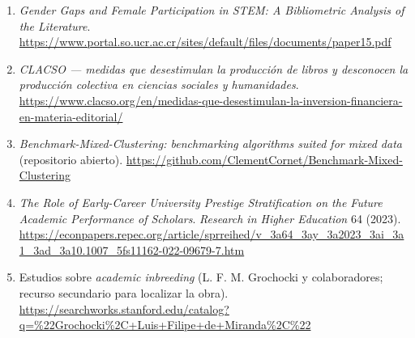 \begin{enumerate}
{        a comparative bibliometric analysis (2020--2024)}.
        \url{https://pure.ucacue.edu.ec/en/publications/disparidades-de-g%C3%A9nero-en-la-producci%C3%B3n-cient%C3%ADfica-de-la-comunida/}
  \item \emph{Gender Gaps and Female Participation in STEM: A Bibliometric
        Analysis of the Literature}.
        \url{https://www.portal.so.ucr.ac.cr/sites/default/files/documents/paper15.pdf}
  \item \emph{CLACSO — medidas que desestimulan la producción de libros y
        desconocen la producción colectiva en ciencias sociales y humanidades}.
        \url{https://www.clacso.org/en/medidas-que-desestimulan-la-inversion-financiera-en-materia-editorial/}
  \item \emph{Benchmark-Mixed-Clustering: benchmarking algorithms suited for
        mixed data} (repositorio abierto).
        \url{https://github.com/ClementCornet/Benchmark-Mixed-Clustering}
  \item \emph{The Role of Early-Career University Prestige Stratification on
        the Future Academic Performance of Scholars}. \emph{Research in Higher
        Education} 64 (2023).
        \url{https://econpapers.repec.org/article/sprreihed/v_3a64_3ay_3a2023_3ai_3a1_3ad_3a10.1007_5fs11162-022-09679-7.htm}
  \item Estudios sobre \emph{academic inbreeding} (L. F. M. Grochocki y
        colaboradores; recurso secundario para localizar la obra).
        \url{https://searchworks.stanford.edu/catalog?q=%22Grochocki%2C+Luis+Filipe+de+Miranda%2C%22}
\end{enumerate}
